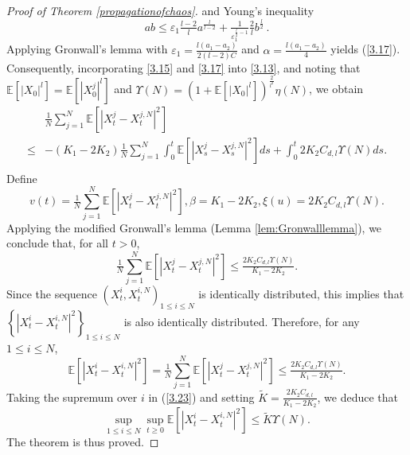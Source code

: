 \documentclass[12pt]{article}
\numberwithin{equation}{section}
\begin{document}
\begin{proof}[Proof of Theorem \ref{propagationofchaos}]
and   Young's inequality
\begin{equation}\tag{5.13}\label{3.20}
ab\leq \varepsilon_{1} \tfrac{l-2}{l}a^{\frac{l}{l-2}}+\tfrac{1}{\varepsilon ^{\frac{l}{2}-1}_{1}}\tfrac{2}{l}b^{\frac{l}{2}}\,. 
\end{equation}
Applying Gronwall's lemma with $\varepsilon_{1} =\tfrac{l\left(a_1-a_2\right)}{2\left( l-2 \right) C}$ and $\alpha =\tfrac{l\left( a_1-a_2 \right)}{4}$ yields (\ref{3.17}). 
Consequently,     incorporating \eqref{3.15} and \eqref{3.17} into \eqref{3.13}, and noting that $\mathbb{E} \left[\left|X_0\right|^{l}\right]=\mathbb{E} \left[\left|X_0^{j}\right|^{l}\right]$ and $\Upsilon \left(N\right)=\left(1+\mathbb{E}\left[\left|X_0\right|^{l}\right]\right)^{\frac{2}{{l^2}}}\eta \left(N\right)$, we obtain
\begin{equation}\tag{5.14}\label{3.21}
\begin{aligned}
&\tfrac{1}{N}\sum_{j=1}^N{\mathbb{E} \left[ \left| X_{t}^{j}-X_{t}^{j,N} \right|^2 \right]}\\
\leq& -\left( K_1-2K_2 \right) \tfrac{1}{N}\sum_{j=1}^N{\int_0^t{\mathbb{E} \left[ \left| X_{s}^{j}-X_{s}^{j,N} \right|^2 \right]}}ds+\int_0^t{2K_2C_{d,l}\Upsilon \left(N\right)ds}.\\
\end{aligned}
\end{equation}
Define
\begin{equation}\tag{5.15}
v\left(t\right)= \tfrac{1}{N}\sum_{j=1}^N{\mathbb{E} \left[ \left| X_{t}^{j}-X_{t}^{j,N} \right|^2 \right]} , \beta=K_1-2K_2 , \xi\left(u\right)=2K_2C_{d,l}\Upsilon \left(N\right).
\end{equation}
Applying the modified Gronwall's lemma (Lemma \ref{lem:Gronwalllemma}), we conclude that, for all $t>0$,
\begin{equation}\tag{5.16}\label{3.22}
\tfrac{1}{N}\sum_{j=1}^N{\mathbb{E}\left[ \left| X_{t}^{j}-X_{t}^{j,N} \right|^2\right]} \leq \tfrac{2K_2C_{d,l}\Upsilon \left(N\right)}{K_1-2K_2}.
\end{equation}
Since the  sequence  $\left( X_{t}^{i} ,  X_{t}^{i,N} \right) _{1\leqslant i\leqslant N}$  is  identically distributed, this implies that $\left\{ \left| X_{t}^{i}-X_{t}^{i,N} \right|^2 \right\} _{1\leqslant i\leqslant N}$ is also identically distributed. Therefore, for any $1\leq i\leq N$,
\begin{equation}\tag{5.17}\label{3.23}
\mathbb{E} \left[ \left| X_{t}^{i}-X_{t}^{i,N} \right|^2 \right] =\tfrac{1}{N}\sum_{j=1}^N{\mathbb{E} \left[ \left| X_{t}^{j}-X_{t}^{j,N} \right|^2 \right]}\le \tfrac{2K_2C_{d,l}\Upsilon \left(N\right)}{K_1-2K_2}.
\end{equation}
Taking the supremum over $i$ in (\ref{3.23}) and setting $\widetilde{K}=\tfrac{2K_2C_{d,l}}{K_1-2K_2}
$, we deduce that
\begin{equation}\tag{5.18}\label{3.24}
\underset{1\leqslant i\leqslant N}{\sup}\underset{t\geqslant 0}{\sup}\mathbb{E} \left[ \left| X_{t}^{i}-X_{t}^{i,N} \right|^2 \right] \leq \widetilde{K}\Upsilon \left(N\right).
\end{equation}
The theorem is thus proved.  
\end{proof}
\end{document}
